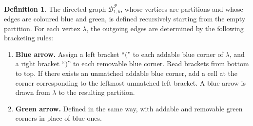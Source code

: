 \documentclass[11pt]{article}
\theoremstyle{definition}
\newtheorem{definition}[theorem]{Definition}
\theoremstyle{remark}
\theoremstyle{definition}
\numberwithin{equation}{section}
\begin{document}
\begin{definition}\label{def:partition_model_1}
  The directed graph \( \mathcal{B}_{1,b}^{\mathcal{P}} \), whose
  vertices are partitions and whose edges are coloured blue and green,
  is defined recursively starting from the empty partition. For each
  vertex \( \lambda \), the outgoing edges are determined by the
  following bracketing rules:
  \begin{enumerate}
  \item \textbf{Blue arrow.} Assign a left bracket ``$($'' to each
    addable blue corner of \( \lambda \), and a right bracket ``$)$''
    to each removable blue corner. Read brackets from bottom to top.
    If there exists an unmatched addable blue corner, add a cell at the corner corresponding to the leftmost unmatched left bracket. A
    blue arrow is drawn from \( \lambda \) to the resulting partition.
  \item \textbf{Green arrow.} Defined in the same way, with addable and
    removable green corners in place of blue ones.
  \end{enumerate}
\end{definition}
\end{document}
